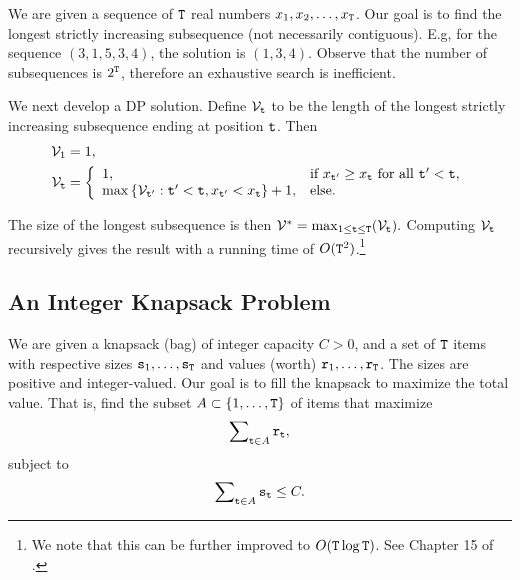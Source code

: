 We are given a sequence of ${\tt T}$ real numbers ${x_1},{x_2}, \ldots ,{x_{{\tt T}}}$. Our goal is to find the longest strictly increasing subsequence (not necessarily contiguous).
E.g, for the sequence $(3,1,5,3,4)$, the solution is $(1,3,4)$.
Observe that the number of subsequences is ${2^{{\tt T}}}$, therefore an exhaustive search is inefficient.

We next develop a DP solution. Define  ${\mathcal{V}_{{\tt t}}}$ to be the length of the longest strictly increasing subsequence ending at position ${\tt t}$.
Then 
\begin{equation*}
\begin{split}
    {\mathcal{V}_1} &= 1, \\
    \mathcal{V}_{{\tt t}} &= \left\{\begin{array}{ll}
  1, & \text{if } x_{{\tt t}'}\geq x_{{\tt t}} \text{ for all } {\tt t}'<{\tt t}, \\
  \max \left\{{\mathcal{V}_{{\tt t}'} : {\tt t}'<{\tt t}, x_{{\tt t}'}<x_{{\tt t}}}\right\}+1,& \text{else}. \end{array}\right. 
\end{split}
\end{equation*}

The size of the longest subsequence is then $\mathcal{V}^* = {\max _{1 \le {\tt t} \le {\tt T}}}({\mathcal{V}_{{\tt t}}}).$ 
Computing ${\mathcal{V}_{{\tt t}}}$ recursively gives the result with a running time of $O({{\tt T}^2})$.\footnote{We note that this can be further improved to $O({\tt T}\log {\tt T})$. See Chapter 15 of
\cite{BookCormenLRS2009}.}


\subsection*{An Integer Knapsack Problem}

We are given a knapsack (bag) of integer capacity $C > 0$, and a set of ${\tt T}$ items with respective sizes ${{\tt s}_1}, \ldots ,{{\tt s}_{{\tt T}}}$ and values (worth) ${{\tt r}_1}, \ldots ,{{\tt r}_{{\tt T}}}$. The sizes are positive and integer-valued. Our goal is to fill the knapsack to maximize the total value. That is, find the subset $A \subset \{ 1, \ldots ,{\tt T}\} $ of items that maximize \[\sum\nolimits_{{\tt t} \in A} {{{\tt r}_{{\tt t}}}} ,\] subject to  \[\sum\nolimits_{{\tt t} \in A} {{{\tt s}_{\tt t}}}  \le C.\]


